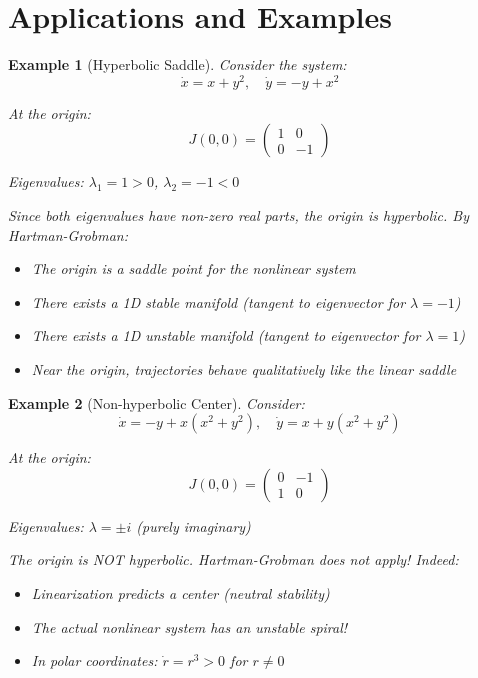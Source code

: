 \documentclass[12pt]{article}
\newtheorem{example}{Example}
\begin{document}
\section{Applications and Examples}

\begin{example}[Hyperbolic Saddle]
Consider the system:
$$\dot{x} = x + y^2, \quad \dot{y} = -y + x^2$$

At the origin:
$$J(0,0) = \begin{pmatrix} 1 & 0 \\ 0 & -1 \end{pmatrix}$$

Eigenvalues: $\lambda_1 = 1 > 0$, $\lambda_2 = -1 < 0$

Since both eigenvalues have non-zero real parts, the origin is hyperbolic. By Hartman-Grobman:
\begin{itemize}
    \item The origin is a saddle point for the nonlinear system
    \item There exists a 1D stable manifold (tangent to eigenvector for $\lambda = -1$)
    \item There exists a 1D unstable manifold (tangent to eigenvector for $\lambda = 1$)
    \item Near the origin, trajectories behave qualitatively like the linear saddle
\end{itemize}
\end{example}

\begin{example}[Non-hyperbolic Center]
Consider:
$$\dot{x} = -y + x(x^2 + y^2), \quad \dot{y} = x + y(x^2 + y^2)$$

At the origin:
$$J(0,0) = \begin{pmatrix} 0 & -1 \\ 1 & 0 \end{pmatrix}$$

Eigenvalues: $\lambda = \pm i$ (purely imaginary)

The origin is NOT hyperbolic. Hartman-Grobman does not apply! Indeed:
\begin{itemize}
    \item Linearization predicts a center (neutral stability)
    \item The actual nonlinear system has an unstable spiral!
    \item In polar coordinates: $\dot{r} = r^3 > 0$ for $r \neq 0$
\end{itemize}
\end{example}
\end{document}
